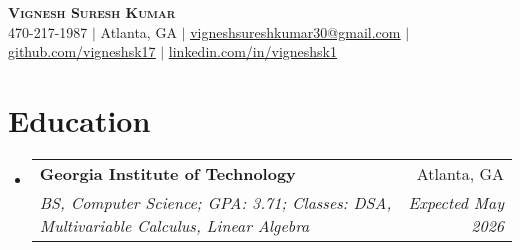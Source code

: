 \documentclass[letterpaper,11pt]{article}
\makeatletter
\newcommand{\resumeItem}[1]{
  \item\small{
    {#1 \vspace{-2pt}}
  }
}
\newcommand{\resumeSubheading}[4]{%
\vspace{-1pt}%
  \item
    \begin{tabular*}{0.97\textwidth}{l@{\extracolsep{\fill}}r}
      \textbf{#1} & #2 \\
      \textit{\small#3} & \textit{\small #4} \\

    \end{tabular*}%
  \vspace{-9pt}
}
\newcommand{\resumeSubHeadingListStart}{\begin{itemize}[leftmargin=0.15in, label={}]}
\newcommand{\resumeSubHeadingListEnd}{\end{itemize}}
\newcommand{\resumeItemListStart}{\begin{itemize}}
\newcommand{\resumeItemListEnd}{\end{itemize}\vspace{-5pt}}
\makeatother
\begin{document}

\begin{center}
    \textbf{\Huge \scshape Vignesh Suresh Kumar} \\ \vspace{1pt}
    \small 470-217-1987 $|$ \small Atlanta, GA $|$
    \href{mailto:vigneshsureshkumar30@gmail.com}{\underline{vigneshsureshkumar30@gmail.com}} $|$
    \href{https://github.com/VigneshSK17}{\underline{github.com/vigneshsk17}} $|$
    \href{https://www.linkedin.com/in/vigneshsk1}{\underline{linkedin.com/in/vigneshsk1}}
\end{center}


\section{Education}
  \resumeSubHeadingListStart
    \resumeSubheading
      {Georgia Institute of Technology}{Atlanta, GA}
      {BS, Computer Science; GPA: 3.71; Classes: DSA, Multivariable Calculus, Linear Algebra}{Expected May 2026}

  \resumeSubHeadingListEnd



\end{document}

